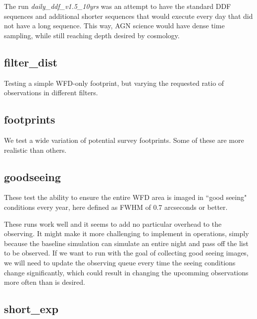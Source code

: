 The run \emph{daily\_ddf\_v1.5\_10yrs} was an attempt to have the standard DDF sequences and additional shorter sequences that would execute every day that did not have a long sequence.  This way, AGN science would have dense time sampling, while still reaching depth desired by cosmology.


\subsection{filter\_dist}

Testing a simple WFD-only footprint, but varying the requested ratio of observations in different filters.


\subsection{footprints}

We test a wide variation of potential survey footprints. Some of these are more realistic than others. 

\subsection{goodseeing}\label{ss:goodseeing}

These test the ability to ensure the entire WFD area is imaged in ``good seeing" conditions every year, here defined as FWHM of 0.7 arcseconds or better.  

These runs work well and it seems to add no particular overhead to the observing. It might make it more challenging to implement in operations, simply because the baseline simulation can simulate an entire night and pass off the list to be observed. If we want to run with the goal of collecting good seeing images, we will need to update the observing queue every time the seeing conditions change significantly, which could result in changing the upcomming observations more often than is desired.


\subsection{short\_exp}

